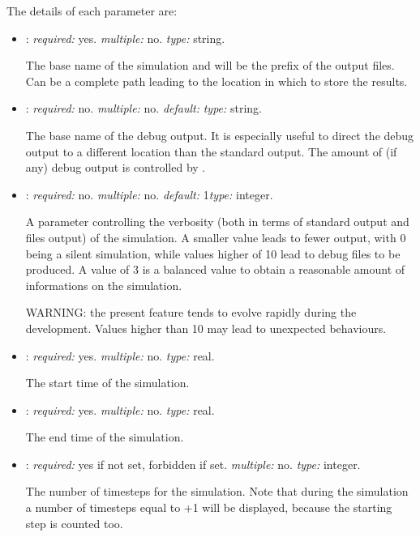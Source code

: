 The details of each parameter are:
\begin{itemize}
\item {}: \textit{required:} yes. \textit{multiple:} no. \textit{type:} string.

The base name of the simulation and will be the prefix of the output files. 
Can be a complete path leading to the location in which to store the results. 

\item {}: \textit{required:} no. \textit{multiple:} no. 
\textit{default:}  \textit{type:} string.

The base name of the debug output. It is especially useful to direct the 
debug output to a different location than the standard output. 
The amount of (if any) debug output is controlled by .

\item {}: \textit{required:} no. \textit{multiple:} no. 
\textit{default:} 1\textit{type:} integer.

A parameter controlling the verbosity (both in terms of standard output and files output) 
of the simulation. A smaller value leads to fewer output, with 0 being a silent simulation, 
while values higher of 10 lead to debug files to be produced. 
A value of 3 is a balanced value to obtain a reasonable amount of informations 
on the simulation. 

WARNING: the present feature tends to evolve rapidly during the development. 
Values higher than 10 may lead to unexpected behaviours. 


\item {}: \textit{required:} yes. \textit{multiple:} no. \textit{type:} real.

The start time of the simulation.

\item {}: \textit{required:} yes. \textit{multiple:} no. \textit{type:} real.

The end time of the simulation.

\item {}: \textit{required:} yes if  not set, forbidden if set. 
\textit{multiple:} no. \textit{type:} integer.

The number of timesteps for the simulation. Note that during the simulation a number 
of timesteps equal to +1 will be displayed, because the starting step 
is counted too. 


\end{itemize}
